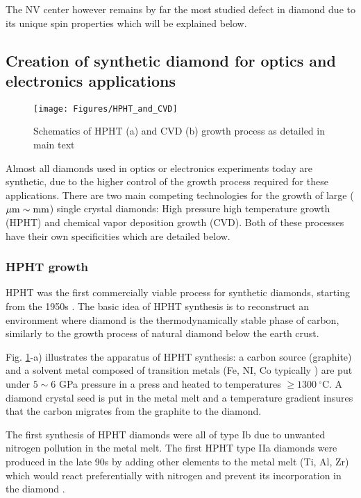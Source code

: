 \documentclass[a4paper,11pt]{report}
\begin{document}
The NV center however remains by far the most studied defect in diamond due to its unique spin properties which will be explained below.

\subsection{Creation of synthetic diamond for optics and electronics applications}
\begin{figure}[h!]
\centering
\texttt{[image: Figures/HPHT\_and\_CVD]}
\caption{Schematics of HPHT (a) and CVD (b) growth process as detailed in main text}
\label{HPHT and CVD}
\end{figure}

Almost all diamonds used in optics or electronics experiments today are synthetic, due to the higher control of the growth process required for these applications. There are two main competing technologies for the growth of large ($\mu \rm{m} \sim \rm{mm}$) single crystal diamonds: High pressure high temperature growth (HPHT) and chemical vapor deposition growth (CVD). Both of these processes have their own specificities which are detailed below.

\subsubsection{HPHT growth}

HPHT was the first commercially viable process for synthetic diamonds, starting from the 1950s \citep{barnard2000diamond, bundy1955man}. The basic idea of HPHT synthesis is to reconstruct an environment where diamond is the thermodynamically stable phase of carbon, similarly to the growth process of natural diamond below the earth crust. 

Fig. \ref{HPHT and CVD}-a) illustrates the apparatus of HPHT synthesis: a carbon source (graphite) and a solvent metal composed of transition metals (Fe, NI, Co typically \citep{bundy1963direct}) are put under $5 \sim 6$ GPa pressure in a press and heated to temperatures $\geq 1300\ ^\circ$C. A diamond crystal seed is put in the metal melt and a temperature gradient insures that the carbon migrates from the graphite to the diamond.

The first synthesis of HPHT diamonds were all of type Ib due to unwanted nitrogen pollution in the metal melt. The first HPHT type IIa diamonds were produced in the late 90s by adding other elements to the metal melt (Ti, Al, Zr) which would react preferentially with nitrogen and prevent its incorporation in the diamond \citep{burns1999growth, sumiya2002growth}.
\end{document}
